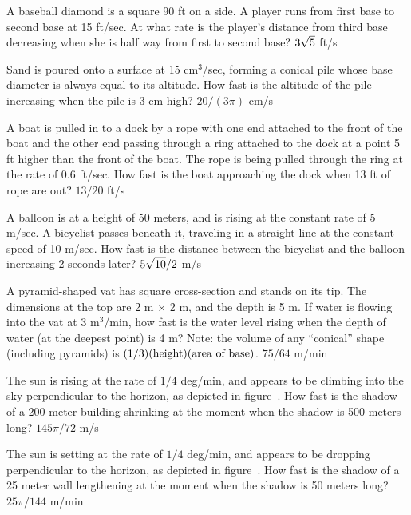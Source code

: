 \exercise
A baseball diamond is a square 90 ft on a side.  A player runs from first
base to second base at 15 ft/sec.  At what rate is the player's distance
from third base decreasing when she is half way from first to second base?
\answer $\displaystyle 3\sqrt5$ ft/s
\endanswer
\endexercise

\exercise Sand is poured onto a surface at 15 cm${}^3$/sec, forming a
conical pile whose base diameter is always equal to its altitude.  How
fast is the altitude of the pile increasing when the pile is 3 cm
high?
\answer $20/(3\pi)$ cm/s
\endanswer
\endexercise

\exercise
A boat is pulled in to a dock by a rope with one end attached to the front
of the boat and the other end passing through a ring attached to the dock
at a point 5 ft higher than the front of the boat.  The rope is being
pulled through the ring at the rate of 0.6 ft/sec.  How fast is the boat
approaching the dock when 13 ft of rope are out?
\answer $13/20$ ft/s
\endanswer
\endexercise

\exercise
A balloon is at a height of 50 meters, and is rising at the constant rate
of 5 m/sec.  A bicyclist passes beneath it, traveling in a
straight line at the constant speed of 10 m/sec.  How fast is the distance
between the bicyclist and the balloon increasing 2 seconds later?
\answer $\displaystyle 5\sqrt{10}/2$ m/s
\endanswer
\endexercise

\exercise A pyramid-shaped vat has square cross-section and stands on its
tip.  The dimensions at the top are 2 m $\times$ 2 m, and the depth is
5 m.  If water is flowing into the vat at 3 m${}^3$/min, how fast is
the water level rising when the depth of water (at the deepest point)
is 4 m?  Note: the volume of any ``conical'' shape (including
pyramids) is $(1/3)(\hbox{height})(\hbox{area of base})$.
\answer $75/64$ m/min
\endanswer
\endexercise

\exercise
The sun is rising at the rate of $1/4$ deg/min, and appears to be
climbing into the sky perpendicular to the
horizon, as depicted in figure~.
How fast is the shadow of a 200 meter building
shrinking at the moment when the shadow is 500 meters long? 
\answer $145\pi/72$ m/s
\endanswer
\endexercise

\exercise The sun is setting at the rate of $1/4$ deg/min, and appears
to be dropping perpendicular to the horizon, as depicted in
figure~. How fast is the shadow of a 25
meter wall lengthening at the moment when the shadow is 50 meters long?
\answer $25\pi/144$ m/min
\endanswer

